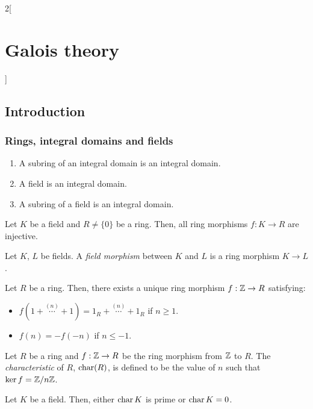 \documentclass[../../../main.tex]{subfiles}
\begin{document}
\begin{multicols}{2}[\section{Galois theory}]
  \subsection{Introduction}
  \subsubsection{Rings, integral domains and fields}
  \begin{prop}
    \hfill
    \begin{enumerate}
      \item A subring of an integral domain is an integral domain.
      \item A field is an integral domain.
      \item A subring of a field is an integral domain.
    \end{enumerate}
  \end{prop}
  \begin{lemma}
    Let $K$ be a field and $R\ne\{0\}$ be a ring. Then, all ring morphisms $f:K\rightarrow R$ are injective.
  \end{lemma}
  \begin{definition}
    Let $K$, $L$ be fields. A \emph{field morphism} between $K$ and $L$ is a ring morphism $K\rightarrow L$.
  \end{definition}
  \begin{lemma}
    Let $R$ be a ring. Then, there exists a unique ring morphism $f:\mathbb{Z}\rightarrow R$ satisfying:
    \begin{itemize}
      \item $f(1+\overset{(n)}{\cdots}+1)=1_R+\overset{(n)}{\cdots}+1_R$ if $n\geq 1$.
      \item $f(n)=-f(-n)$ if $n\leq -1$.
    \end{itemize}
  \end{lemma}
  \begin{definition}
    Let $R$ be a ring and $f:\mathbb{Z}\rightarrow R$ be the ring morphism from $\mathbb{Z}$ to $R$. The \emph{characteristic} of $R$, $\operatorname{char} (R)$, is defined to be the value of $n$ such that $\ker f=\quot{\ZZ}{n\ZZ}$.
  \end{definition}
  \begin{prop}
    Let $K$ be a field. Then, either $\operatorname{char} K$ is prime or $\operatorname{char} K=0$.

\end{prop}
\end{multicols}
\end{document}
